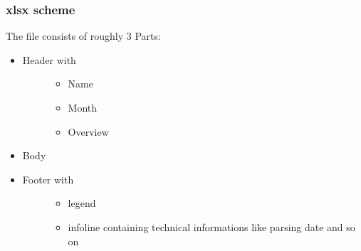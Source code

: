 \documentclass[letterpaper,10pt,english]{sphinxmanual}
\begin{document}
\subsubsection{xlsx scheme}
\label{\detokenize{devmanual:xlsx-scheme}}
The  file consists of roughly 3 Parts:
\begin{itemize}
\item {} \begin{description}
\item[{Header with}] \leavevmode\begin{itemize}
\item {} 
Name

\item {} 
Month

\item {} 
Overview

\end{itemize}

\end{description}

\item {} 
Body

\item {} \begin{description}
\item[{Footer with}] \leavevmode\begin{itemize}
\item {} 
legend

\item {} 
infoline containing technical informations like parsing date and so on

\end{itemize}

\end{description}

\end{itemize}
\end{document}
